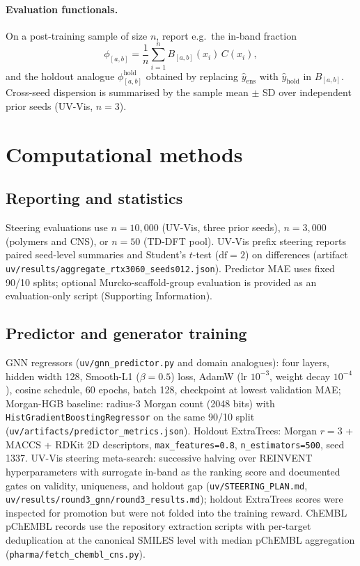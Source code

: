 \documentclass[12pt]{article}
\begin{document}
\paragraph{Evaluation functionals.} On a post-training sample of size $n$, report e.g.\ the in-band
fraction
\begin{equation}
\phi_{[a,b]}=\frac{1}{n}\sum_{i=1}^{n} B_{[a,b]}(x_i)\,C(x_i),
\end{equation}
and the holdout analogue $\phi^{\mathrm{hold}}_{[a,b]}$ obtained by replacing
$\hat{y}_{\mathrm{ens}}$ with $\hat{y}_{\mathrm{hold}}$ in $B_{[a,b]}$. Cross-seed dispersion is
summarised by the sample mean $\pm$ SD over independent prior seeds (UV-Vis, $n=3$).

\section{Computational methods}

\subsection{Reporting and statistics}
Steering evaluations use $n=10{,}000$ (UV-Vis, three prior seeds), $n=3{,}000$ (polymers and CNS),
or $n=50$ (TD-DFT pool). UV-Vis prefix steering reports paired seed-level summaries and
Student's $t$-test ($\mathrm{df}=2$) on differences (artifact
\texttt{uv/results/aggregate\_rtx3060\_seeds012.json}). Predictor MAE uses fixed 90/10 splits;
optional Murcko-scaffold-group evaluation is provided as an evaluation-only script (Supporting Information).

\subsection{Predictor and generator training}
GNN regressors (\texttt{uv/gnn\_predictor.py} and domain analogues): four layers, hidden width 128,
Smooth-L1 ($\beta{=}0.5$) loss, AdamW (lr $10^{-3}$, weight decay $10^{-4}$), cosine schedule, 60 epochs,
batch 128, checkpoint at lowest validation MAE; Morgan-HGB baseline: radius-3 Morgan count (2048 bits)
with \texttt{HistGradientBoostingRegressor} on the same 90/10 split (\texttt{uv/artifacts/predictor\_metrics.json}).
Holdout ExtraTrees: Morgan $r{=}3$ + MACCS + RDKit 2D descriptors, \texttt{max\_features=0.8},
\texttt{n\_estimators=500}, seed 1337. UV-Vis steering meta-search: successive halving over REINVENT
hyperparameters with surrogate in-band as the ranking score and documented gates on validity,
uniqueness, and holdout gap (\texttt{uv/STEERING\_PLAN.md}, \texttt{uv/results/round3\_gnn/round3\_results.md});
holdout ExtraTrees scores were inspected for promotion but were not folded into the training reward.
ChEMBL pChEMBL records use the repository extraction scripts with per-target deduplication at the
canonical SMILES level with median pChEMBL aggregation (\texttt{pharma/fetch\_chembl\_cns.py}).
\end{document}
